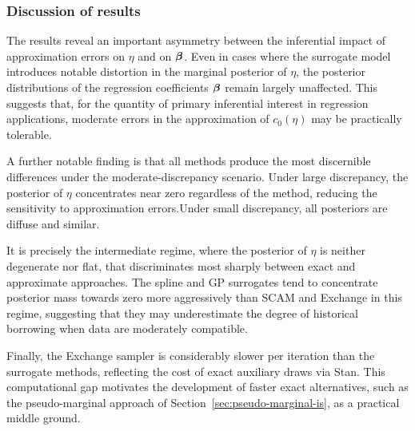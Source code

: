 





\subsubsection{Discussion of results}

The results reveal an important asymmetry between the inferential impact of approximation errors on $\eta$ and on $\boldsymbol{\beta}$.
Even in cases where the surrogate model introduces notable distortion in the marginal posterior of $\eta$, the posterior distributions of the regression coefficients $\boldsymbol{\beta}$ remain largely unaffected.
This suggests that, for the quantity of primary inferential interest in regression applications, moderate errors in the approximation of $c_0(\eta)$ may be practically tolerable.

A further notable finding is that all methods produce the most discernible differences under the moderate-discrepancy scenario.
Under large discrepancy, the posterior of $\eta$ concentrates near zero regardless of the method, reducing the sensitivity to approximation errors.Under small discrepancy, all posteriors are diffuse and similar.

It is precisely the intermediate regime, where the posterior of $\eta$ is neither degenerate nor flat, that discriminates most sharply between exact and approximate approaches.
The spline and GP surrogates tend to concentrate posterior mass towards zero more aggressively than SCAM and Exchange in this regime, suggesting that they may underestimate the degree of historical borrowing when data are moderately compatible.

Finally, the Exchange sampler is considerably slower per iteration than the surrogate methods, reflecting the cost of exact auxiliary draws via Stan.
This computational gap motivates the development of faster exact alternatives, such as the pseudo-marginal approach of Section~\ref{sec:pseudo-marginal-is}, as a practical middle ground.